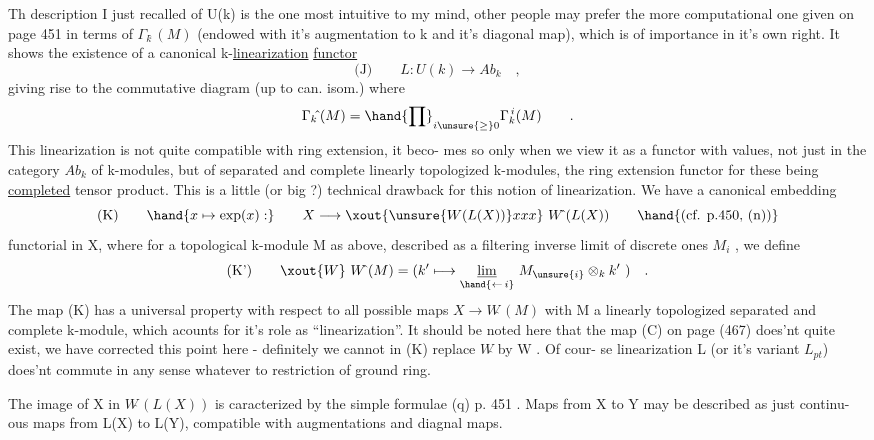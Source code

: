 
Th description I just recalled of U(k) is the one most intuitive to
my mind,  other people may prefer the more computational one given on
page 451 in terms of $\Gamma_k\hat{}\,(M)$  (endowed with it's augmentation to k and it's
diagonal map),  which is of importance in it's own right.  It shows
the existence of a canonical k-\uline{linearization} \uline{functor}
\[ \text{(J)} \qquad L : U(k) \longrightarrow Ab_k \quad , \]
giving rise to the commutative diagram (up to can. isom.)
where
\[ \Gamma_k\hat{}\,(M) = \hand{\prod}_{i\unsure{\geq}0} \Gamma_k^{\,i}(M) \qquad . \]
This linearization is not quite compatible with ring extension,  it beco-%
mes so only when we view it as a functor with values,  not just in the
category $Ab_k$ of k-modules,  but of separated and complete 
linearly topologized k-modules,  the ring extension functor for these
being \uline{completed} tensor product.  This is a little (or big ?) technical
 drawback for this notion of linearization.  We have a canonical embedding
\[ \text{(K)} \qquad \hand{x \mapsto \exp(x) :} \qquad X \longrightarrow \xout{\unsure{W(L(X))}xxx}\ W\hat{}\,(L(X)) \qquad \hand{\text{(cf. p.450, (n))}} \]
functorial in X,   where for a topological k-module M
as above,  described as a filtering inverse limit of discrete ones $M_i$ ,
we define
\[ \text{(K')} \qquad \xout{W}\ W\hat{}\,(M) = (k' \longmapsto \underset{\hand{\leftarrow\, i}}{\underline{\lim}}\ M_{\unsure{i}} \otimes_k k' \ ) \quad . \]
The map (K) has a universal property with respect to all possible maps
$X \to W\hat{}\,(M)$  with M a linearly topologized separated and complete k-module,
which acounts for it's role as ``linearization''.  It should be noted here
that the map (C) on page (467) does'nt quite exist,  we have corrected
this point here -  definitely we cannot in (K) replace $W\hat{}$ by W .  Of cour-%
se linearization L (or it's variant $L_{pt}$)  does'nt commute in any sense
whatever to restriction of ground ring.

The image of  X  in $W\hat{}\,(L(X))$  is caracterized by the simple
formulae (q) p. 451 .  Maps from X to Y  may be described as just continu-%
ous  maps from  L(X) to L(Y),  compatible with augmentations and diagnal
maps.

